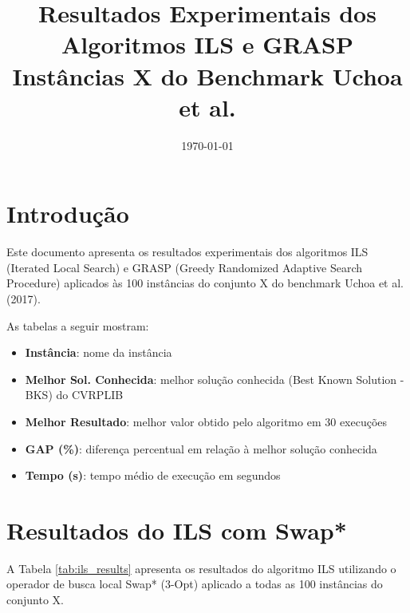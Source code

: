 \documentclass[12pt,a4paper]{article}
\title{Resultados Experimentais dos Algoritmos ILS e GRASP\\Instâncias X do Benchmark Uchoa et al.}
\author{}
\date{\today}
\begin{document}
\maketitle

\section{Introdução}

Este documento apresenta os resultados experimentais dos algoritmos ILS (Iterated Local Search) e GRASP (Greedy Randomized Adaptive Search Procedure) aplicados às 100 instâncias do conjunto X do benchmark Uchoa et al. (2017).

As tabelas a seguir mostram:
\begin{itemize}
    \item \textbf{Instância}: nome da instância
    \item \textbf{Melhor Sol. Conhecida}: melhor solução conhecida (Best Known Solution - BKS) do CVRPLIB
    \item \textbf{Melhor Resultado}: melhor valor obtido pelo algoritmo em 30 execuções
    \item \textbf{GAP (\%)}: diferença percentual em relação à melhor solução conhecida
    \item \textbf{Tempo (s)}: tempo médio de execução em segundos
\end{itemize}

\clearpage

\section{Resultados do ILS com Swap*}

A Tabela \ref{tab:ils_results} apresenta os resultados do algoritmo ILS utilizando o operador de busca local Swap* (3-Opt) aplicado a todas as 100 instâncias do conjunto X.
\end{document}

